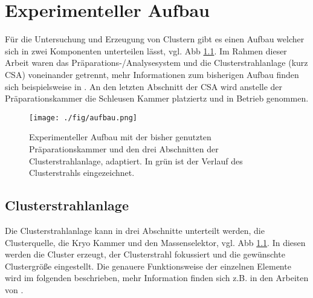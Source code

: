 \chapter{Experimenteller Aufbau}
Für die Untersuchung und Erzeugung von Clustern gibt es einen Aufbau welcher sich in zwei Komponenten unterteilen lässt, vgl. Abb \ref{fig:csaaufbau}.
Im Rahmen dieser Arbeit waren das Präparations-/Analysesystem und die Clusterstrahlanlage (kurz CSA) voneinander getrennt, mehr Informationen zum bisherigen Aufbau finden sich beispielsweise in \cite{wolter}.
An den letzten Abschnitt der CSA wird anstelle der Präparationskammer die Schleusen Kammer platziertz und in Betrieb genommen.
\begin{figure}
    \centering
    \texttt{[image: ./fig/aufbau.png]}
    \caption{Experimenteller Aufbau mit der bisher genutzten Präparationskammer und den drei Abschnitten der Clusterstrahlanlage, \cite[S. 20]{wolter} adaptiert. 
    In grün ist der Verlauf des Clusterstrahls eingezeichnet.}
    \label{fig:csaaufbau}
\end{figure}

\section{Clusterstrahlanlage}
Die Clusterstrahlanlage kann in drei Abschnitte unterteilt werden, die Clusterquelle, die Kryo Kammer und den Massenselektor, vgl. Abb \ref{fig:csaaufbau}.
In diesen werden die Cluster erzeugt, der Clusterstrahl fokussiert und die gewünschte Clustergröße eingestellt.
Die genauere Funktionsweise der einzelnen Elemente wird im folgenden beschrieben, mehr Information finden sich z.B. in den Arbeiten von \cite{duffe, schröder, wolter}.
